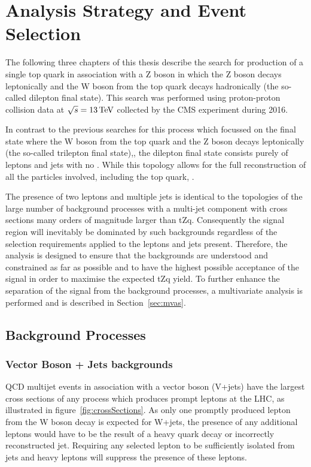 \chapter{Analysis Strategy and Event Selection}\label{chapter:tzq-search}
The following three chapters of this thesis describe the search for production of a single top quark in association with a Z boson in which the Z boson decays leptonically and the W boson from the top quark decays hadronically (the so-called dilepton final state).
This search was performed using proton-proton collision data at $\sqrt{s} = 13\,\text{Te\hspace{-.08em}V}$ collected by the CMS experiment during 2016.

In contrast to the previous searches for this process which focussed on the final state where the W boson from the top quark and the Z boson decays leptonically (the so-called trilepton final state),\cite{Sirunyan:2017kkr,Sirunyan:2017nbr}, the dilepton final state consists purely of leptons and jets with no \MET.
While this topology allows for the full reconstruction of all the particles involved, including the top quark, .

The presence of two leptons and multiple jets is identical to the topologies of the large number of background processes with a multi-jet component with cross sections many orders of magnitude larger than tZq.
Consequently the signal region will inevitably be dominated by such backgrounds regardless of the selection requirements applied to the leptons and jets present.
Therefore, the analysis is designed to ensure that the backgrounds are understood and constrained as far as possible and to have the highest possible acceptance of the signal in order to maximise the expected tZq yield.
To further enhance the separation of the signal from the background processes, a multivariate analysis is performed and is described in Section~\ref{sec:mvas}.

\section{Background Processes}\label{sec:backgroundProcesses}
\subsection{Vector Boson + Jets backgrounds}
QCD multijet events in association with a vector boson (V+jets) have the largest cross sections of any process which produces prompt leptons at the LHC, as illustrated in figure~\ref{fig:crossSections}.
As only one promptly produced lepton from the W boson decay is expected for W+jets, the presence of any additional leptons would have to be the result of a heavy quark decay or incorrectly reconstructed jet. 
Requiring any selected lepton to be sufficiently isolated from jets and heavy leptons will suppress the presence of these leptons.

